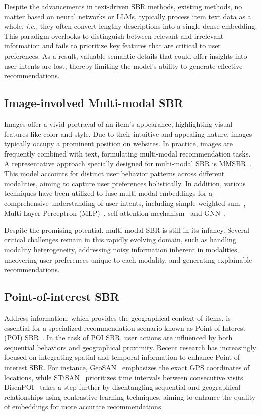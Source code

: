 \documentclass[lettersize,journal]{IEEEtran}
\newcommand{\ie}{\emph{i.e.,}\xspace}
\begin{document}
Despite the advancements in text-driven SBR methods, existing methods, no matter based on neural networks or LLMs, typically process item text data as a whole, \ie they often convert lengthy descriptions into a single dense embedding. This paradigm overlooks to distinguish between relevant and irrelevant information and fails to prioritize key features that are critical to user preferences. As a result, valuable semantic details that could offer insights into user intents are lost, thereby limiting the model's ability to generate effective recommendations.



\subsection{Image-involved Multi-modal SBR}\label{imagesbr}
Images offer a vivid portrayal of an item's appearance, highlighting visual features like color and style. Due to their intuitive and appealing nature, images typically occupy a prominent position on websites. In practice, images are frequently combined with text, formulating multi-modal recommendation tasks. A representative approach specially designed for multi-modal SBR is MMSBR~\cite{MMSBR}. This model accounts for distinct user behavior patterns across different modalities, aiming to capture user preferences holistically. In addition, various techniques have been utilized to fuse multi-modal embeddings for a comprehensive understanding of user intents, including simple weighted sum~\cite{P-RNN}, Multi-Layer Perceptron (MLP)~\cite{MMMLP}, self-attention mechanism~\cite{Pan@CIKM2022,Bian@CIKM2023} and GNN~\cite{Hu@CIKM2023}. 

Despite the promising potential, multi-modal SBR is still in its infancy. Several critical challenges remain in this rapidly evolving domain, such as handling modality heterogeneity, addressing noisy information inherent in modalities, uncovering user preferences unique to each modality, and generating explainable recommendations.

\subsection{Point-of-interest SBR}
Address information, which provides the geographical context of items, is essential for a specialized recommendation scenario known as Point-of-Interest (POI) SBR~\cite{Zhang@IS2020}. In the task of POI SBR, user actions are influenced by both sequential behaviors and geographical proximity. Recent research has increasingly focused on integrating spatial and temporal information to enhance Point-of-interest SBR. For instance, GeoSAN~\cite{Lian@KDD2020} emphasizes the exact GPS coordinates of locations, while STiSAN~\cite{Wang@ICDE2022} prioritizes time intervals between consecutive visits. DisenPOI~\cite{Qin@WSDM2023} takes a step further by disentangling sequential and geographical relationships using contrastive learning techniques, aiming to enhance the quality of embeddings for more accurate recommendations.
\end{document}
